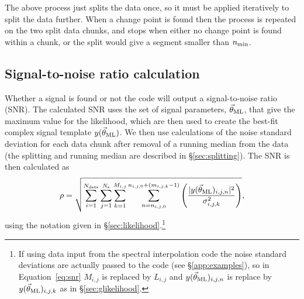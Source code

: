 The above process just splits the data once, so it must be applied iteratively to split the data further. When a change point is
found then the process is repeated on the two split data chunks, and stops when either no change point is found within a chunk,
or the split would give a segment smaller than $n_{\rm min}$.

\subsection{Signal-to-noise ratio calculation}\label{sec:snr}

Whether a signal is found or not the code will output a signal-to-noise ratio (SNR). The calculated SNR uses the set of signal
parameters, $\vec{\theta}_{\rm ML}$, that give the maximum value for the likelihood, which are then used to create the best-fit
complex signal template $y(\vec{\theta}_{\rm ML})$. We then use calculations of the
noise standard deviation for each data chunk after removal of a running median from the data (the splitting and running median are
described in \S\ref{sec:splitting}). The SNR is then calculated as
\begin{equation}\label{eq:snr}
 \rho = \sqrt{\sum_{i=1}^{N_{\rm dets}} \sum_{j=1}^{N_{\rm s}}
\sum_{k=1}^{M_{i,j}} \sum_{n=n_{i,j,0}}^{n_{i,j,0}+(m_{i,j,k}-1)}\left(\frac{|y(\vec{\theta}_{\rm ML})_{i,j,n}|^2}{\sigma_{i,j,k}^2}\right)},
\end{equation}
using the notation given in \S\ref{sec:likelihood}.\footnote{If using data input from the spectral interpolation code \citep{2017CQGra..34a5010D}
the noise standard deviations are actually passed to the code (see \S\ref{app:examples}), so in Equation~\ref{eq:snr} $M_{i,j}$ is replaced
by $L_{i,j}$ and $y(\vec{\theta}_{\rm ML})_{i,j,n}$ is replace by $y(\vec{\theta}_{\rm ML})_{i,j,k}$ as in \S\ref{sec:glikelihood}.}


